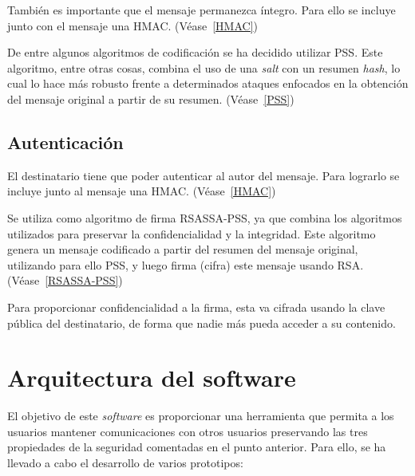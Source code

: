 También es importante que el mensaje permanezca íntegro. Para ello se incluye junto con el mensaje una HMAC. (Véase~\ref{HMAC})

De entre algunos algoritmos de codificación se ha decidido utilizar PSS. Este algoritmo, entre otras cosas, combina el uso de una \emph{salt} con un resumen \emph{hash}, lo cual lo hace más robusto frente a determinados ataques enfocados en la obtención del mensaje original a partir de su resumen. (Véase~\ref{PSS})

\subsection{Autenticación}

El destinatario tiene que poder autenticar al autor del mensaje. Para lograrlo se incluye junto al mensaje una HMAC. (Véase~\ref{HMAC})

Se utiliza como algoritmo de firma RSASSA-PSS, ya que combina los algoritmos utilizados para preservar la confidencialidad y la integridad. Este algoritmo genera un mensaje codificado a partir del resumen del mensaje original, utilizando para ello PSS, y luego firma (cifra) este mensaje usando RSA. (Véase~\ref{RSASSA-PSS})

Para proporcionar confidencialidad a la firma, esta va cifrada usando la clave pública del destinatario, de forma que nadie más pueda acceder a su contenido.


\section{Arquitectura del software}

El objetivo de este \emph{software} es proporcionar una herramienta que permita a los usuarios mantener comunicaciones con otros usuarios preservando las tres propiedades de la seguridad comentadas en el punto anterior. Para ello, se ha llevado a cabo el desarrollo de varios prototipos:

